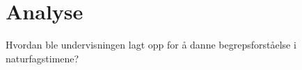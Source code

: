 \documentclass[main.tex]{subfiles}
\begin{document}
\section*{Analyse}
\label{sec:2}
Hvordan ble undervisningen lagt opp for å danne begrepsforståelse i naturfagstimene?





\end{document}
